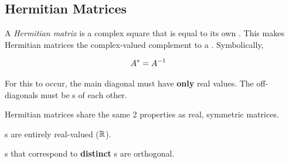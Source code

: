 \subsection{Hermitian Matrices}\label{subsec:Hermitian_Matrices}
\begin{definition}\label{def:Hermitian_Matrix}
  A \emph{Hermitian matrix} is a complex square  that is equal to its own .
  This makes Hermitian matrices the complex-valued complement to a .
  Symbolically,

  \begin{equation}\label{eq:Hermitian_Matrix}
    \begin{aligned}
      A^{*} &= A^{-1}
    \end{aligned}
  \end{equation}

  For this to occur, the main diagonal must have \textbf{only} real values.
  The off-diagonals must be s of each other.

  Hermitian matrices share the same 2 properties as real, symmetric matrices.
  \begin{propertylist}
  \item {}s are entirely real-valued ($\operatorname{\mathbb{R}}$).\label{prop:Hermitian_Matrix-Real_Eigenvalues}
  \item {}s that correspond to \textbf{distinct} s are orthogonal.\label{prop:Hermitian_Matrix-Orthogonal_Eigenvectors}
  \end{propertylist}
\end{definition}


